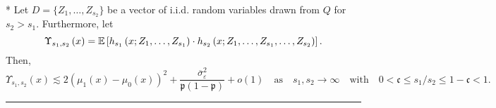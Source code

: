 \newpage
\begin{lem}\label{lem:CATE_upsilon_s}\mbox{}\\*
	Let $D = \{Z_1, \dotsc, Z_{s_2}\}$ be a vector of i.i.d. random variables drawn from $Q$ for $s_2 > s_1$.
	Furthermore, let
	\begin{equation}
		\Upsilon_{s_1, s_2}\left(x\right)
		= \mathbb{E}\left[h_{s_1}\left(x; Z_1, \ldots,  Z_{s_1}\right) \cdot
			h_{s_2}\left(x; Z_1, \ldots,Z_{s_1}, \ldots, Z_{s_2}\right)\right].
	\end{equation}
	Then,
	\begin{equation}
		\Upsilon_{s_1, s_2}\left(x\right)
		\lesssim  2\left(\mu_1(x) - \mu_0(x)\right)^2 + \frac{\overline{\sigma}^2_{\varepsilon}}{\mathfrak{p}(1 - \mathfrak{p})} + o(1)
		\quad \text{as} \quad s_1, s_2 \rightarrow \infty
		\quad \text{with} \quad
		0 < \mathfrak{c} \leq s_1 / s_2 \leq 1 - \mathfrak{c} < 1.
	\end{equation}
\end{lem}
\hrule
